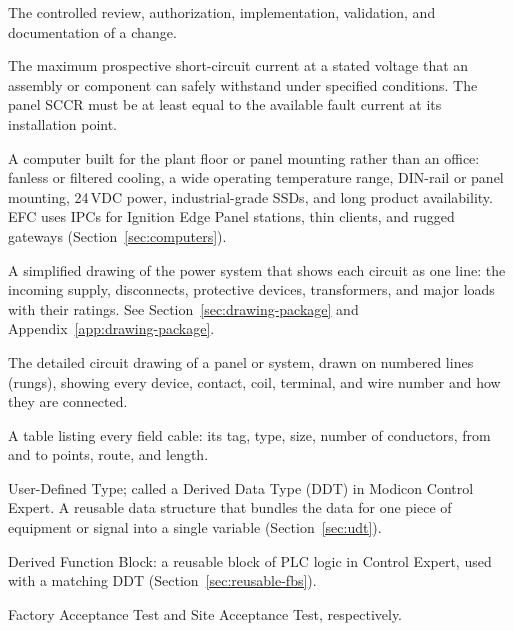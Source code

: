 \begin{description}[style=nextline,leftmargin=0pt]
  \item[Management of Change (MOC)] The controlled review, authorization, implementation, validation, and documentation of a change.
  \item[Short-Circuit Current Rating (SCCR)] The maximum prospective short-circuit current at a stated voltage that an assembly or component can safely withstand under specified conditions. The panel SCCR must be at least equal to the available fault current at its installation point.
  \item[Industrial PC (IPC)] A computer built for the plant floor or panel mounting rather than an office: fanless or filtered cooling, a wide operating temperature range, DIN-rail or panel mounting, 24\,VDC power, industrial-grade SSDs, and long product availability. EFC uses IPCs for Ignition Edge Panel stations, thin clients, and rugged gateways (Section~\ref{sec:computers}).
  \item[Single-line diagram (SLD)] A simplified drawing of the power system that shows each circuit as one line: the incoming supply, disconnects, protective devices, transformers, and major loads with their ratings. See Section~\ref{sec:drawing-package} and Appendix~\ref{app:drawing-package}.
  \item[Electrical schematic] The detailed circuit drawing of a panel or system, drawn on numbered lines (rungs), showing every device, contact, coil, terminal, and wire number and how they are connected.
  \item[Cable schedule] A table listing every field cable: its tag, type, size, number of conductors, from and to points, route, and length.
  \item[UDT / DDT] User-Defined Type; called a Derived Data Type (DDT) in Modicon Control Expert. A reusable data structure that bundles the data for one piece of equipment or signal into a single variable (Section~\ref{sec:udt}).
  \item[DFB] Derived Function Block: a reusable block of PLC logic in Control Expert, used with a matching DDT (Section~\ref{sec:reusable-fbs}).
  \item[FAT/SAT] Factory Acceptance Test and Site Acceptance Test, respectively.
\end{description}
